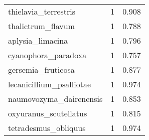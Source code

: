 \begin{tabular}{lrr}
           thielavia\_terrestris &                   1 &     0.908 \\
              thalictrum\_flavum &                   1 &     0.788 \\
               aplysia\_limacina &                   1 &     0.796 \\
            cyanophora\_paradoxa &                   1 &     0.757 \\
             gersemia\_fruticosa &                   1 &     0.877 \\
       lecanicillium\_psalliotae &                   1 &     0.974 \\
        naumovozyma\_dairenensis &                   1 &     0.853 \\
          oxyuranus\_scutellatus &                   1 &     0.815 \\
           tetradesmus\_obliquus &                   1 &     0.974 \\
\bottomrule
\end{tabular}
